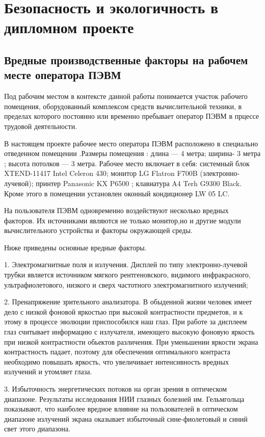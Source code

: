 \section{Безопасность и экологичность в дипломном проекте}

\subsection{Вредные производственные факторы на рабочем месте оператора ПЭВМ}
Под рабочим местом в контексте данной работы понимается участок рабочего
помещения, оборудованный комплексом средств вычислительной техники, в
пределах которого постоянно или временно пребывает оператор ПЭВМ в прцессе трудовой деятельности.


В настоящем проекте рабочее место оператора ПЭВМ расположено в 
специально отведенном помещении .Размеры помещения : длина — 4 метра;
ширина- 3 метра ; высота потолков — 3 метра. Рабочее место включает в себя:
системный блок XTEND-11417 Intel Celeron 430;  монитор LG Flatron F700B
(электронно-лучевой);  принтер  Panasonic KX P6500 ; клавиатура A4 Terh 
G9300 Black. Кроме этого в помещении установлен оконный кондиционер
LW 05 LC.

На пользователя ПЭВМ одновременно воздействуют несколько вредных факторов.
Их источниками являются не только монитор,но и другие модули вычислительного устройства
и факторы окружающей среды. 

Ниже приведены основные вредные факторы.
\begin{par}
		1. Электромагнитные поля и излучения.
		Дисплей по типу электронно-лучевой трубки является источником мягкого рентгеновского,
		видимого инфракрасного, ультрафиолетового, низкого и сверх
		частотного электромагнитного излучений;
\end{par}
\begin{par}
		2. Пренапряжение зрительного анализатора.
		В обыденной жизни человек имеет дело с низкой фоновой яркостью при высокой
		контрастности предметов, и к этому в процессе эволюции приспособился наш глаз.
		При работе за дисплеем глаз считывает информацию  с излучателя, имеющего
		высокую фоновую яркость при низкой контрастности обьектов различения.
		При уменьшении яркости экрана контрастность падает, поэтому для обеспечения
		оптимального контраста необходимо повышать яркость, что увеличивает интенсивность
		вредных излучений и утомляет глаза.
\end{par}
\begin{par}
	3.	Избыточность энергетических потоков на орган зрения в оптическом диапазоне.
		Результаты исследования НИИ глазных болезней им. Гельмгольца показывают,
		что наиболее вредное влияние на пользователей в оптическом диапазоне излучений экрана
		оказывает избыточный сине-фиолетовый и синий свет этого диапазона.
\end{par}

